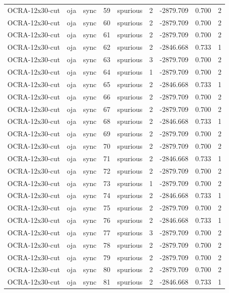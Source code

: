 \begin{tabular}{lllrlrrrr}
OCRA-12x30-cut & oja & sync & 59 & spurious & 2 & -2879.709 & 0.700 & 2 \\
OCRA-12x30-cut & oja & sync & 60 & spurious & 2 & -2879.709 & 0.700 & 2 \\
OCRA-12x30-cut & oja & sync & 61 & spurious & 2 & -2879.709 & 0.700 & 2 \\
OCRA-12x30-cut & oja & sync & 62 & spurious & 2 & -2846.668 & 0.733 & 1 \\
OCRA-12x30-cut & oja & sync & 63 & spurious & 3 & -2879.709 & 0.700 & 2 \\
OCRA-12x30-cut & oja & sync & 64 & spurious & 1 & -2879.709 & 0.700 & 2 \\
OCRA-12x30-cut & oja & sync & 65 & spurious & 2 & -2846.668 & 0.733 & 1 \\
OCRA-12x30-cut & oja & sync & 66 & spurious & 2 & -2879.709 & 0.700 & 2 \\
OCRA-12x30-cut & oja & sync & 67 & spurious & 2 & -2879.709 & 0.700 & 2 \\
OCRA-12x30-cut & oja & sync & 68 & spurious & 2 & -2846.668 & 0.733 & 1 \\
OCRA-12x30-cut & oja & sync & 69 & spurious & 2 & -2879.709 & 0.700 & 2 \\
OCRA-12x30-cut & oja & sync & 70 & spurious & 2 & -2879.709 & 0.700 & 2 \\
OCRA-12x30-cut & oja & sync & 71 & spurious & 2 & -2846.668 & 0.733 & 1 \\
OCRA-12x30-cut & oja & sync & 72 & spurious & 2 & -2879.709 & 0.700 & 2 \\
OCRA-12x30-cut & oja & sync & 73 & spurious & 1 & -2879.709 & 0.700 & 2 \\
OCRA-12x30-cut & oja & sync & 74 & spurious & 2 & -2846.668 & 0.733 & 1 \\
OCRA-12x30-cut & oja & sync & 75 & spurious & 2 & -2879.709 & 0.700 & 2 \\
OCRA-12x30-cut & oja & sync & 76 & spurious & 2 & -2846.668 & 0.733 & 1 \\
OCRA-12x30-cut & oja & sync & 77 & spurious & 3 & -2879.709 & 0.700 & 2 \\
OCRA-12x30-cut & oja & sync & 78 & spurious & 2 & -2879.709 & 0.700 & 2 \\
OCRA-12x30-cut & oja & sync & 79 & spurious & 2 & -2879.709 & 0.700 & 2 \\
OCRA-12x30-cut & oja & sync & 80 & spurious & 2 & -2879.709 & 0.700 & 2 \\
OCRA-12x30-cut & oja & sync & 81 & spurious & 2 & -2846.668 & 0.733 & 1 \\

\end{tabular}
